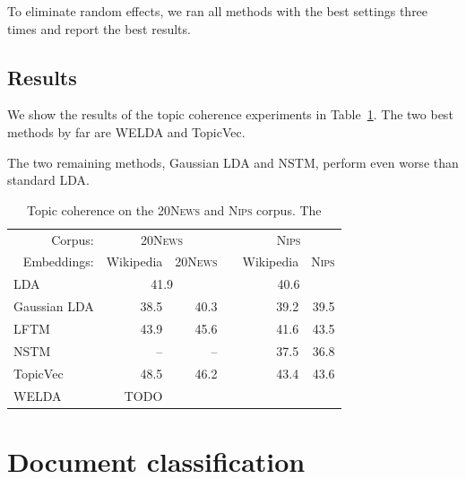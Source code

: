 \documentclass[
        a4paper,
        titlepage,
        twoside,
        parskip
        ]{scrbook}
\newcommand{\ra}[1]{\renewcommand{\arraystretch}{#1}}
\theoremstyle{break}
\begin{document}
To eliminate random effects, we ran all methods with the best settings three times and report the best results.

\subsection{Results}
We show the results of the topic coherence experiments in Table~\ref{table:topic_coherence}.
The two best methods by far are WELDA and TopicVec.


The two remaining methods, Gaussian LDA and NSTM, perform even worse than standard LDA.

\begin{table}[]
  \ra{1.3}
  \centering
  \caption{Topic coherence on the \textsc{20News} and \textsc{Nips} corpus. The }
  \label{table:topic_coherence}
  \begin{tabular}{@{}lrrcrr@{}}
    \toprule
                 \multicolumn{1}{r}{Corpus:} & \multicolumn{2}{c}{\textsc{20News}} && \multicolumn{2}{c}{\textsc{Nips}} \\ \cmidrule{2-3} \cmidrule{5-6}
                 \multicolumn{1}{r}{Embeddings:}  & Wikipedia     & \textsc{20News}     && Wikipedia     & \textsc{Nips}     \\
                 \midrule
                              LDA          & \multicolumn{2}{c}{41.9}   && \multicolumn{2}{c}{40.6} \\
                              Gaussian LDA & 38.5          & 40.3       && 39.2          & 39.5     \\
                              LFTM         & 43.9          & 45.6       && 41.6          & 43.5     \\
                              NSTM         & --            & --         && 37.5          & 36.8     \\
                              TopicVec     & 48.5          & 46.2       && 43.4          & 43.6     \\
                              WELDA        & TODO          &            &&               &          \\
                              \bottomrule
  \end{tabular}
\end{table}

\section{Document classification}
\end{document}
